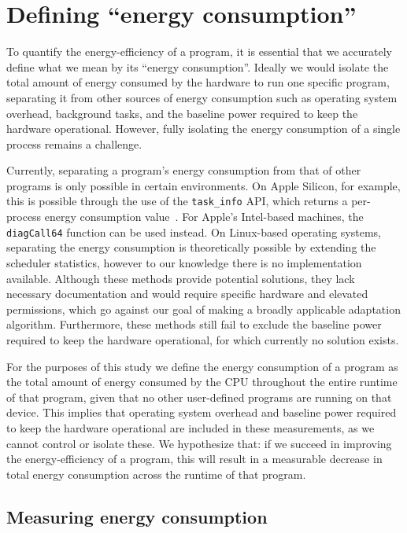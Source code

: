 
\section{Defining ``energy consumption''}\label{sec:defining-energy}

To quantify the energy-efficiency of a program, it is essential that we accurately define what we mean by its ``energy consumption''.
Ideally we would isolate the total amount of energy consumed by the hardware to run one specific program, separating it from other sources of energy consumption such as operating system overhead, background tasks, and the baseline power required to keep the hardware operational.
However, fully isolating the energy consumption of a single process remains a challenge.

Currently, separating a program's energy consumption from that of other programs is only possible in certain environments.
On Apple Silicon, for example, this is possible through the use of the \verb|task_info| API, which returns a per-process energy consumption value~\cite{firefox-profiling}.
For Apple's Intel-based machines, the \verb|diagCall64| function can be used instead.
On Linux-based operating systems, separating the energy consumption is theoretically possible by extending the scheduler statistics, however to our knowledge there is no implementation available.
Although these methods provide potential solutions, they lack necessary documentation and would require specific hardware and elevated permissions, which go against our goal of making a broadly applicable adaptation algorithm.
Furthermore, these methods still fail to exclude the baseline power required to keep the hardware operational, for which currently no solution exists.

For the purposes of this study we define the energy consumption of a program as the total amount of energy consumed by the CPU throughout the entire runtime of that program, given that no other user-defined programs are running on that device.
This implies that operating system overhead and baseline power required to keep the hardware operational are included in these measurements, as we cannot control or isolate these.
We hypothesize that: if we succeed in improving the energy-efficiency of a program, this will result in a measurable decrease in total energy consumption across the runtime of that program.

\subsection{Measuring energy consumption}


